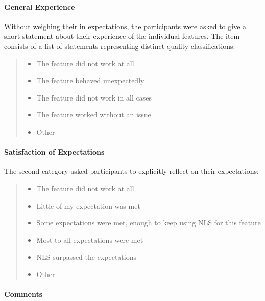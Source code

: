 \documentclass[
  a4paper,
  bibtex,
  english,
  nomenclature]{kthlatex/kththesis/kththesis}
\providecommand{\tightlist}{%
  \setlength{\itemsep}{0pt}\setlength{\parskip}{0pt}}
\begin{document}
\hypertarget{sec:general-experience}{%
\paragraph{General Experience}\label{sec:general-experience}}

Without weighing their in expectations, the participants were asked to
give a short statement about their experience of the individual
features. The item consists of a list of statements representing
distinct quality classifications:

\begin{quote}
\begin{itemize}
\tightlist
\item[$\square$]
  The feature did not work at all
\item[$\square$]
  The feature behaved unexpectedly
\item[$\square$]
  The feature did not work in all cases
\item[$\square$]
  The feature worked without an issue
\item[$\square$]
  Other
\end{itemize}
\end{quote}

\hypertarget{sec:satisfaction-of-expectations}{%
\paragraph{Satisfaction of
Expectations}\label{sec:satisfaction-of-expectations}}

The second category asked participants to explicitly reflect on their
expectations:

\begin{quote}
\begin{itemize}
\tightlist
\item[$\square$]
  The feature did not work at all
\item[$\square$]
  Little of my expectation was met
\item[$\square$]
  Some expectations were met, enough to keep using NLS for this feature
\item[$\square$]
  Most to all expectations were met
\item[$\square$]
  NLS surpassed the expectations
\item[$\square$]
  Other
\end{itemize}
\end{quote}

\hypertarget{sec:comments}{%
\paragraph{Comments}\label{sec:comments}}
\end{document}
